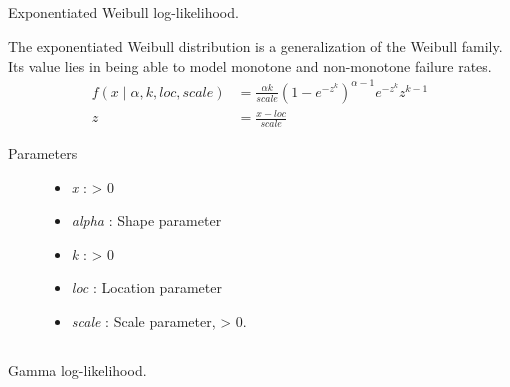 \documentclass[]{jss}
\begin{document}
\subsection[exponentiated Weibull]{ }

Exponentiated Weibull log-likelihood.

The exponentiated Weibull distribution is a generalization of the Weibull
family. Its value lies in being able to model monotone and non-monotone
failure rates.
\begin{align*}
    f(x \mid \alpha,k,loc,scale)  & = \frac{\alpha k}{scale} (1-e^{-z^k})^{\alpha-1} e^{-z^k} z^{k-1} \\
    z & = \frac{x-loc}{scale}    
\end{align*}
\begin{description}
\item[Parameters] \leavevmode\begin{itemize}
\item {} 
\emph{x} : \textgreater{} 0

\item {} 
\emph{alpha} : Shape parameter

\item {} 
\emph{k} : \textgreater{} 0

\item {} 
\emph{loc} : Location parameter

\item {} 
\emph{scale} : Scale parameter, \textgreater{} 0.

\end{itemize}

\end{description}

\subsection[gamma]{ }

Gamma log-likelihood.
\end{document}
